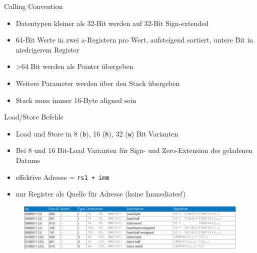 \documentclass[
  german,            %
  aspectratio=169,    %
]{tumbeamer}
\begin{document}
\begin{frame}[c]{Calling Convention}                                    
  \begin{itemize}
    \item Datentypen kleiner als 32-Bit werden auf 32-Bit Sign-extended
    \item 64-Bit Werte in zwei a-Registern pro Wert, aufsteigend sortiert, untere Bit in niedrigerem Register
    \item >64 Bit werden als Pointer übergeben
    \item Weitere Parameter werden über den Stack übergeben
    \item Stack muss immer 16-Byte aligned sein
 \end{itemize}                                          
\end{frame}

\begin{frame}{Load/Store Befehle}
	\begin{itemize}
		\item Load und Store in 8 (\texttt{b}), 16 (\texttt{h}), 32 (\texttt{w}) Bit Varianten
		\item Bei 8 und 16 Bit-Load Varianten für Sign- und Zero-Extension des geladenen Datums
		\item effektive Adresse = \texttt{rs1 + imm}
		\item nur Register als Quelle für Adresse (keine Immediates!)
	\end{itemize}
	\begin{figure}
		\centering
		\includegraphics[width=.95\textwidth]{w03_loadbefehle.png}
	\end{figure}
\end{frame}
\end{document}
